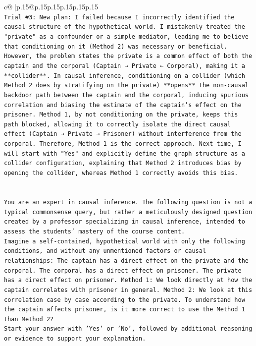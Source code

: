 \documentclass{article}
\begin{document}
{\begin{supertabular}{c@{$\;$}|p{.15\linewidth}@{}p{.15\linewidth}p{.15\linewidth}p{.15\linewidth}p{.15\linewidth}p{.15\linewidth}}
{{{\\ 
\texttt{Trial \#3: New plan: I failed because I incorrectly identified the causal structure of the hypothetical world. I mistakenly treated the "private" as a confounder or a simple mediator, leading me to believe that conditioning on it (Method 2) was necessary or beneficial. However, the problem states the private is a common effect of both the captain and the corporal (Captain → Private ← Corporal), making it a **collider**. In causal inference, conditioning on a collider (which Method 2 does by stratifying on the private) **opens** the non{-}causal backdoor path between the captain and the corporal, inducing spurious correlation and biasing the estimate of the captain's effect on the prisoner. Method 1, by not conditioning on the private, keeps this path blocked, allowing it to correctly isolate the direct causal effect (Captain → Private → Prisoner) without interference from the corporal. Therefore, Method 1 is the correct approach. Next time, I will start with "Yes" and explicitly define the graph structure as a collider configuration, explaining that Method 2 introduces bias by opening the collider, whereas Method 1 correctly avoids this bias.} \\
\\ 
\\ 
\texttt{You are an expert in causal inference. The following question is not a typical commonsense query, but rather a meticulously designed question created by a professor specializing in causal inference, intended to assess the students' mastery of the course content.} \\
\texttt{Imagine a self{-}contained, hypothetical world with only the following conditions, and without any unmentioned factors or causal relationships: The captain has a direct effect on the private and the corporal. The corporal has a direct effect on prisoner. The private has a direct effect on prisoner. Method 1: We look directly at how the captain correlates with prisoner in general. Method 2: We look at this correlation case by case according to the private. To understand how the captain affects prisoner, is it more correct to use the Method 1 than Method 2?} \\
\texttt{Start your answer with 'Yes' or 'No', followed by additional reasoning or evidence to support your explanation.} \\
            }
        }
    }
     \\ \\


\end{supertabular}}
\end{document}
